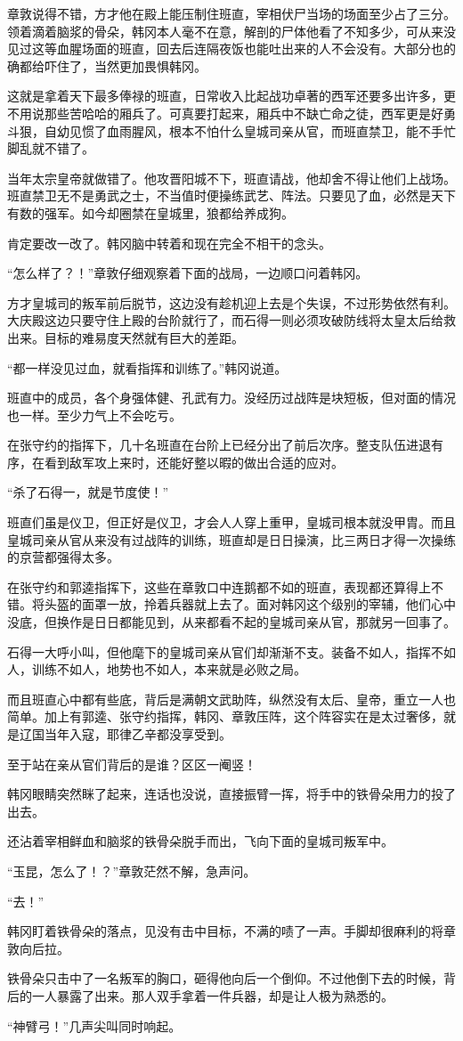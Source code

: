 章敦说得不错，方才他在殿上能压制住班直，宰相伏尸当场的场面至少占了三分。领着滴着脑浆的骨朵，韩冈本人毫不在意，解剖的尸体他看了不知多少，可从来没见过这等血腥场面的班直，回去后连隔夜饭也能吐出来的人不会没有。大部分也的确都给吓住了，当然更加畏惧韩冈。

这就是拿着天下最多俸禄的班直，日常收入比起战功卓著的西军还要多出许多，更不用说那些苦哈哈的厢兵了。可真要打起来，厢兵中不缺亡命之徒，西军更是好勇斗狠，自幼见惯了血雨腥风，根本不怕什么皇城司亲从官，而班直禁卫，能不手忙脚乱就不错了。

当年太宗皇帝就做错了。他攻晋阳城不下，班直请战，他却舍不得让他们上战场。班直禁卫无不是勇武之士，不当值时便操练武艺、阵法。只要见了血，必然是天下有数的强军。如今却圈禁在皇城里，狼都给养成狗。

肯定要改一改了。韩冈脑中转着和现在完全不相干的念头。

“怎么样了？！”章敦仔细观察着下面的战局，一边顺口问着韩冈。

方才皇城司的叛军前后脱节，这边没有趁机迎上去是个失误，不过形势依然有利。大庆殿这边只要守住上殿的台阶就行了，而石得一则必须攻破防线将太皇太后给救出来。目标的难易度天然就有巨大的差距。

“都一样没见过血，就看指挥和训练了。”韩冈说道。

班直中的成员，各个身强体健、孔武有力。没经历过战阵是块短板，但对面的情况也一样。至少力气上不会吃亏。

在张守约的指挥下，几十名班直在台阶上已经分出了前后次序。整支队伍进退有序，在看到敌军攻上来时，还能好整以暇的做出合适的应对。

“杀了石得一，就是节度使！”

班直们虽是仪卫，但正好是仪卫，才会人人穿上重甲，皇城司根本就没甲胄。而且皇城司亲从官从来没有过战阵的训练，班直却是日日操演，比三两日才得一次操练的京营都强得太多。

在张守约和郭逵指挥下，这些在章敦口中连鹅都不如的班直，表现都还算得上不错。将头盔的面罩一放，拎着兵器就上去了。面对韩冈这个级别的宰辅，他们心中没底，但换作是日日都能见到，从来都看不起的皇城司亲从官，那就另一回事了。

石得一大呼小叫，但他麾下的皇城司亲从官们却渐渐不支。装备不如人，指挥不如人，训练不如人，地势也不如人，本来就是必败之局。

而且班直心中都有些底，背后是满朝文武助阵，纵然没有太后、皇帝，重立一人也简单。加上有郭逵、张守约指挥，韩冈、章敦压阵，这个阵容实在是太过奢侈，就是辽国当年入寇，耶律乙辛都没享受到。

至于站在亲从官们背后的是谁？区区一阉竖！

韩冈眼睛突然眯了起来，连话也没说，直接振臂一挥，将手中的铁骨朵用力的投了出去。

还沾着宰相鲜血和脑浆的铁骨朵脱手而出，飞向下面的皇城司叛军中。

“玉昆，怎么了！？”章敦茫然不解，急声问。

“去！”

韩冈盯着铁骨朵的落点，见没有击中目标，不满的啧了一声。手脚却很麻利的将章敦向后拉。

铁骨朵只击中了一名叛军的胸口，砸得他向后一个倒仰。不过他倒下去的时候，背后的一人暴露了出来。那人双手拿着一件兵器，却是让人极为熟悉的。

“神臂弓！”几声尖叫同时响起。

